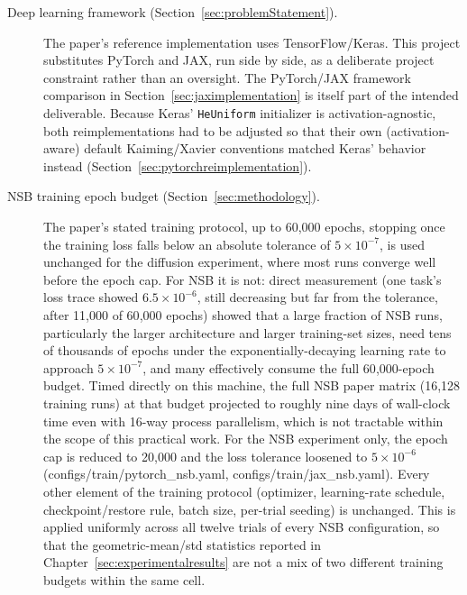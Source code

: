 \begin{description}
  \item[Deep learning framework (Section~\ref{sec:problemStatement}).]
  The paper's reference implementation uses TensorFlow/Keras. This project
  substitutes PyTorch and JAX, run side by side, as a deliberate project
  constraint rather than an oversight. The PyTorch/JAX framework
  comparison in Section~\ref{sec:jaximplementation} is itself part of the
  intended deliverable. Because Keras' \texttt{HeUniform} initializer is
  activation-agnostic, both reimplementations had to be adjusted so that
  their own (activation-aware) default Kaiming/Xavier conventions matched
  Keras' behavior instead (Section~\ref{sec:pytorchreimplementation}).

  \item[NSB training epoch budget (Section~\ref{sec:methodology}).]
  The paper's stated training protocol, up to 60{,}000 epochs, stopping
  once the training loss falls below an absolute tolerance of
  $5\times10^{-7}$, is used unchanged for the diffusion experiment, where
  most runs converge well before the epoch cap. For NSB it is not: direct
  measurement (one task's loss trace showed $6.5\times10^{-6}$, still
  decreasing but far from the tolerance, after 11{,}000 of 60{,}000 epochs)
  showed that a large fraction of NSB runs, particularly the larger
  architecture and larger training-set sizes, need tens of thousands of
  epochs under the exponentially-decaying learning rate to approach
  $5\times10^{-7}$, and many effectively consume the full 60{,}000-epoch
  budget. Timed directly on this machine, the full NSB paper matrix
  (16{,}128 training runs) at that budget projected to roughly nine days of
  wall-clock time even with 16-way process parallelism, which is not
  tractable within the scope of this practical work. For the NSB experiment
  only, the epoch cap is reduced to 20{,}000 and the loss tolerance loosened
  to $5\times10^{-6}$ (configs/train/pytorch\_nsb.yaml,
  configs/train/jax\_nsb.yaml). Every other element of the training
  protocol (optimizer, learning-rate schedule, checkpoint/restore rule,
  batch size, per-trial seeding) is unchanged. This is applied uniformly
  across all twelve trials of every NSB configuration, so that the
  geometric-mean/std statistics reported in
  Chapter~\ref{sec:experimentalresults} are not a mix of two different
  training budgets within the same cell.
\end{description}



